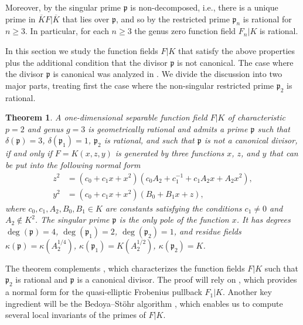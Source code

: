 \documentclass[12pt,reqno]{amsart}
\newcommand{\todoo}[2][]{\todo[size=tiny, #1]{#2}} %
\newtheorem{thm}{Theorem}[section]
\theoremstyle{definition}
\newcommand{\ov}{\overline}
\newcommand{\pp}{\mathfrak{p}}
\newcommand{\de}{\delta}
\newcommand{\ka}{\kappa}
\begin{document}
Moreover, by \cite[Corollary~2.19]{HiSt22} the singular prime $\pp$ is non-decomposed, i.e., there is a unique prime in $\ov K F|\ov K$ that lies over $\pp$, and so by \cite[Theorem~2.24]{HiSt22} the restricted prime $\pp_n$ is rational for $n\geq3$.
In particular, for each $n \geq 3$ the genus zero function field $F_n|K$ is rational.

In this section we study the function fields $F|K$ that satisfy the above properties plus the additional condition that the divisor $\pp$ is not canonical.
The case where the divisor $\pp$ is canonical was analyzed in \cite[Section~3]{HiSt23}.
We divide the discussion into two major parts, treating first the case where the non-singular restricted prime $\pp_2$ is rational.


\begin{thm}\label{2024_02_18_00:35}
A one-dimensional separable function field $F|K$ of characteristic $p=2$ and genus $g = 3$ is geometrically rational and admits a prime $\pp$ such that $\de(\pp) = 3$, $\de(\pp_1) = 1$, $\pp_2$ is rational, and such that $\pp$ is not a canonical divisor, if and only if 
$F=K(x,z,y)$ is generated by three functions $x$, $z$, and $y$ that can be put into the following normal form
\begin{align*}
z^2 &= (c_0 + c_1 x + x^2) (c_0 A_2 + c_1^{-1} + c_1 A_2 x + A_2 x^2), \\
y^2 &= (c_0 + c_1 x + x^2) (B_0 + B_1 x + z),
\end{align*}
where $c_0,c_1,A_2,B_0,B_1\in K$ are constants satisfying the conditions $c_1\neq 0$ and $A_2\notin K^2$.
The singular prime $\pp$ is the only pole of the function $x$.
It has 
degrees $\deg(\pp)=4$, $\deg(\pp_1)=2$, $\deg(\pp_2)=1$, and
residue fields $\ka(\pp)=\ka(A_2^{1/4})$, $\ka(\pp_1)=K(A_2^{1/2})$, $\ka(\pp_2)=K$.
\end{thm}

The theorem complements \cite[Theorem~3.1~(i)]{HiSt23}, which characterizes the function fields $F|K$ such that $\pp_2$ is rational and $\pp$ is a canonical divisor.
The proof will rely on \cite[Section~2]{HiSt23}, which provides a normal form for the quasi-elliptic Frobenius pullback $F_1|K$.
Another key ingredient will be the Bedoya--Stöhr algorithm \cite{BedSt87}, which enables us to compute several local invariants of the primes of $F|K$.
\end{document}

